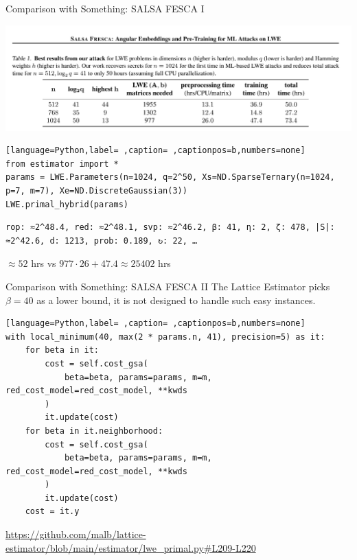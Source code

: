 \documentclass[table,10pt,aspectratio=169]{beamer}
\begin{document}
\begin{frame}[label={sec:orgcc1b4cb},fragile]{Comparison with Something: SALSA FESCA I}
 \begin{center}
\includegraphics[width=.9\linewidth]{./salsa-fresca-results.png}
\end{center}

\begin{lstlisting}[language=Python,label= ,caption= ,captionpos=b,numbers=none]
from estimator import *
params = LWE.Parameters(n=1024, q=2^50, Xs=ND.SparseTernary(n=1024, p=7, m=7), Xe=ND.DiscreteGaussian(3))
LWE.primal_hybrid(params)
\end{lstlisting}

\begin{verbatim}
rop: ≈2^48.4, red: ≈2^48.1, svp: ≈2^46.2, β: 41, η: 2, ζ: 478, |S|: ≈2^42.6, d: 1213, prob: 0.189, ↻: 22, …
\end{verbatim}


\begin{center}
\(\approx 52\) hrs vs \(977 \cdot 26 + 47.4 \approx 25402\) hrs 
\end{center}
\end{frame}

\begin{frame}[label={sec:org98002ca},fragile]{Comparison with \alert{Something}: SALSA FESCA II}
 The Lattice Estimator picks \(\beta = 40\) as a lower bound, it is not designed to handle such easy instances.

\begin{lstlisting}[language=Python,label= ,caption= ,captionpos=b,numbers=none]
with local_minimum(40, max(2 * params.n, 41), precision=5) as it:
    for beta in it:
        cost = self.cost_gsa(
            beta=beta, params=params, m=m, red_cost_model=red_cost_model, **kwds
        )
        it.update(cost)
    for beta in it.neighborhood:
        cost = self.cost_gsa(
            beta=beta, params=params, m=m, red_cost_model=red_cost_model, **kwds
        )
        it.update(cost)
    cost = it.y
\end{lstlisting}

{\footnotesize \url{https://github.com/malb/lattice-estimator/blob/main/estimator/lwe\_primal.py\#L209-L220} \par}
\end{frame}
\end{document}
